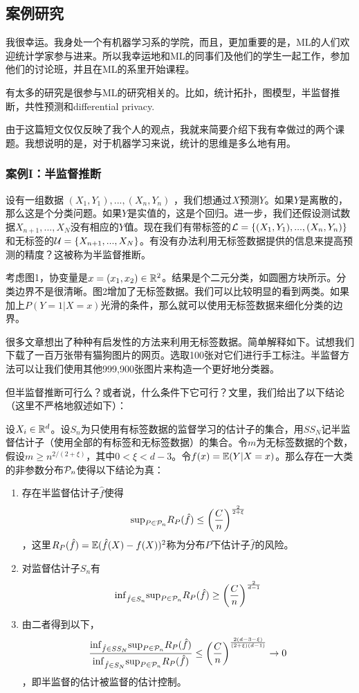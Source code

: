\documentclass[]{article}
\begin{document}
\subsection{案例研究}

我很幸运。我身处一个有机器学习系的学院，而且，更加重要的是，ML的人们欢迎统计学家参与进来。所以我幸运地和ML的同事们及他们的学生一起工作，参加他们的讨论班，并且在ML的系里开始课程。

有太多的研究是很参与ML的研究相关的。比如，统计拓扑，图模型，半监督推断，共性预测和differential privacy.

由于这篇短文仅仅反映了我个人的观点，我就来简要介绍下我有幸做过的两个课题。我想说明的是，对于机器学习来说，统计的思维是多么地有用。

\subsubsection{案例I：半监督推断}

设有一组数据 $(X_1,Y_1),...,(X_n,Y_n)$ ，我们想通过$X$预测$Y$。如果$Y$是离散的，那么这是个分类问题。如果$Y$是实值的，这是个回归。进一步，我们还假设测试数据$X_{n+1},...,X_N$没有相应的$Y$值。现在我们有带标签的${\mathcal{L}}=\{(X_1,Y_1),...,(X_n,Y_n)\}$和无标签的${\mathcal{U}}=\{X_{n+1},...,X_N\}$。有没有办法利用无标签数据提供的信息来提高预测的精度？这被称为半监督推断。

考虑图1，协变量是$x=(x_1,x_2) \in {\mathbb{R}}^2$。结果是个二元分类，如圆圈方块所示。分类边界不是很清晰。图2增加了无标签数据。我们可以比较明显的看到两类。如果加上$P(Y=1\vert X=x)$光滑的条件，那么就可以使用无标签数据来细化分类的边界。

很多文章想出了种种有启发性的方法来利用无标签数据。简单解释如下。试想我们下载了一百万张带有猫狗图片的网页。选取100张对它们进行手工标注。半监督方法可以让我们使用其他999,900张图片来构造一个更好地分类器。

但半监督推断可行么？或者说，什么条件下它可行？文\cite{wass2013}里，我们给出了以下结论（这里不严格地叙述如下）：

设$X_i \in {\mathbb{R}}^d$。设$S_n$为只使用有标签数据的监督学习的估计子的集合，用$SS_N$记半监督估计子（使用全部的有标签和无标签数据）的集合。令$m$为无标签数据的个数，假设$m\geq n^{2/(2+\xi)}$，其中$0 < \xi < d-3$。令$f(x)={\mathbb{E}}(Y\vert X=x)$。那么存在一大类的非参数分布${\mathcal{P}}_n$使得以下结论为真：

\begin{enumerate}
\def\labelenumi{\arabic{enumi}.}
\itemsep1pt\parskip0pt
\item 存在半监督估计子$\hat{f}$使得
    $$ \mathrm{sup}_{P \in {\mathcal{P}}_n} R_P(\hat{f}) \leq \left(\frac{C}{n}\right)^\frac{2}{2+\xi}$$，这里$R_P(\hat{f})={\mathbb{E}}(\hat{f}(X) - f(X))^2$称为分布$P$下估计子$\hat{f}$的风险。
\item 对监督估计子$S_n$有
    $$ \mathrm{inf}_{\hat{f} \in S_n} \mathrm{sup}_{P \in {\mathcal{P}}_n} R_P(\hat{f}) \geq \left( \frac{C}{n} \right)^\frac{2}{d-1} $$
\item 由二者得到以下，
    $$ \frac{\mathrm{inf}_{\hat{f} \in SS_N} \mathrm{sup}_{P\in{\mathcal{P}}_n} R_P(\hat{f}) }{ \mathrm{inf}_{\hat{f} \in S_N} \mathrm{sup}_{P\in{\mathcal{P}}_n} R_P(\hat{f}) } \leq \left(\frac{C}{n}\right)^\frac{2(d-3-\xi)}{(2+\xi)(d-1)} \rightarrow 0 $$，即半监督的估计被监督的估计控制。
\end{enumerate}
\end{document}
